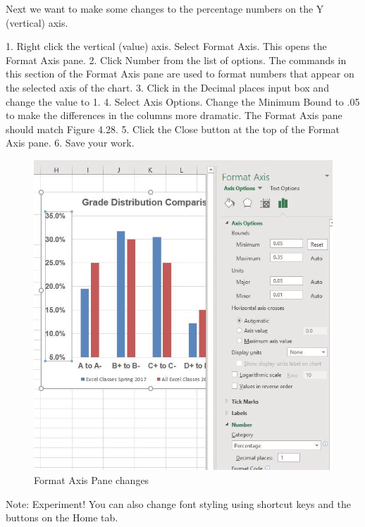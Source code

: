 Next we want to make some changes to the percentage numbers on the Y (vertical) axis.

1. Right click the vertical (value) axis. Select Format Axis. This opens the Format Axis pane.
2. Click Number from the list of options. The commands in this section of the Format Axis pane
are used to format numbers that appear on the selected axis of the chart.
3. Click in the Decimal places input box and change the value to 1.
4. Select Axis Options. Change the Minimum Bound to .05 to make the differences in the
columns more dramatic. The Format Axis pane should match Figure 4.28.
5. Click the Close button at the top of the Format Axis pane.
6. Save your work.


\begin{figure}[H]
	\centering
	\includegraphics[width=\maxwidth{.95\linewidth}]{gfx/ch04_fig31}
	\caption{Format Axis Pane changes}
	\label{04:fig31}
\end{figure}








Note: Experiment! You can also change font styling using shortcut keys and the buttons on the Home
tab.






